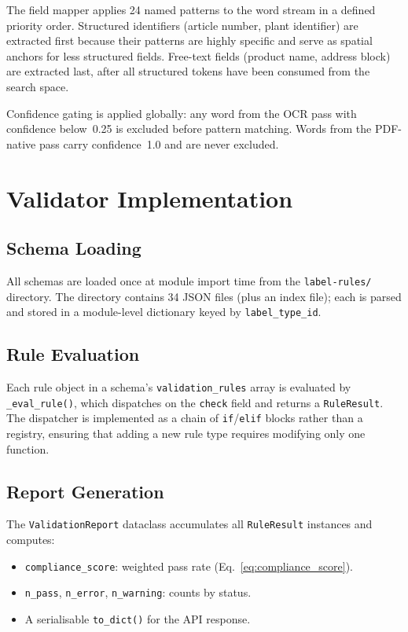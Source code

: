 The field mapper applies 24 named patterns to the word stream in a defined priority order.
Structured identifiers (article number, plant identifier) are extracted first because their
patterns are highly specific and serve as spatial anchors for less structured fields. Free-text
fields (product name, address block) are extracted last, after all structured tokens have been
consumed from the search space.

Confidence gating is applied globally: any word from the \ac{OCR} pass with confidence
below~0.25 is excluded before pattern matching. Words from the PDF-native pass carry
confidence~1.0 and are never excluded.

\section{Validator Implementation}

\subsection{Schema Loading}

All schemas are loaded once at module import time from the \texttt{label-rules/} directory.
The directory contains 34 JSON files (plus an index file); each is parsed and stored in a
module-level dictionary keyed by \texttt{label\_type\_id}.

\subsection{Rule Evaluation}

Each rule object in a schema's \texttt{validation\_rules} array is evaluated by
\texttt{\_eval\_rule()}, which dispatches on the \texttt{check} field and returns a
\texttt{RuleResult}. The dispatcher is implemented as a chain of \texttt{if}/\texttt{elif}
blocks rather than a registry, ensuring that adding a new rule type requires modifying
only one function.

\subsection{Report Generation}

The \texttt{ValidationReport} dataclass accumulates all \texttt{RuleResult} instances and
computes:
\begin{itemize}
  \item \texttt{compliance\_score}: weighted pass rate (Eq.~\ref{eq:compliance_score}).
  \item \texttt{n\_pass}, \texttt{n\_error}, \texttt{n\_warning}: counts by status.
  \item A serialisable \texttt{to\_dict()} for the API response.
\end{itemize}

